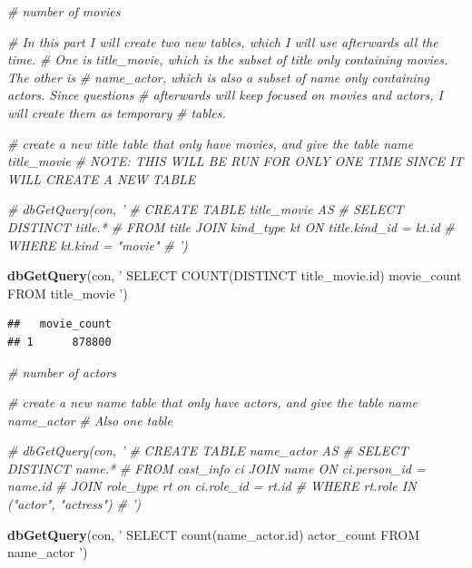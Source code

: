 \documentclass[]{article}
\newenvironment{Shaded}{\begin{snugshade}}{\end{snugshade}}
\newcommand{\KeywordTok}[1]{\textcolor[rgb]{0.13,0.29,0.53}{\textbf{{#1}}}}
\newcommand{\StringTok}[1]{\textcolor[rgb]{0.31,0.60,0.02}{{#1}}}
\newcommand{\CommentTok}[1]{\textcolor[rgb]{0.56,0.35,0.01}{\textit{{#1}}}}
\newcommand{\NormalTok}[1]{{#1}}
\begin{document}
\begin{Shaded}
\begin{Highlighting}[]
\CommentTok{# number of movies}

\CommentTok{# In this part I will create two new tables, which I will use afterwards all the time.}
\CommentTok{# One is title_movie, which is the subset of title only containing movies. The other is}
\CommentTok{# name_actor, which is also a subset of name only containing actors. Since questions}
\CommentTok{# afterwards will keep focused on movies and actors, I will create them as temporary}
\CommentTok{# tables.}

\CommentTok{# create a new title table that only have movies, and give the table name title_movie}
\CommentTok{# NOTE: THIS WILL BE RUN FOR ONLY ONE TIME SINCE IT WILL CREATE A NEW TABLE}

\CommentTok{# dbGetQuery(con, '}
\CommentTok{#            CREATE TABLE title_movie AS}
\CommentTok{#            SELECT DISTINCT title.*}
\CommentTok{#            FROM title JOIN kind_type kt ON title.kind_id = kt.id}
\CommentTok{#            WHERE kt.kind = "movie"}
\CommentTok{#            ')}

\KeywordTok{dbGetQuery}\NormalTok{(con, }\StringTok{'}
\StringTok{           SELECT COUNT(DISTINCT title_movie.id) movie_count}
\StringTok{           FROM title_movie}
\StringTok{           '}\NormalTok{)}
\end{Highlighting}
\end{Shaded}

\begin{verbatim}
##   movie_count
## 1      878800
\end{verbatim}

\begin{Shaded}
\begin{Highlighting}[]
\CommentTok{# number of actors}

\CommentTok{# create a new name table that only have actors, and give the table name name_actor}
\CommentTok{# Also one table}

\CommentTok{# dbGetQuery(con, '}
\CommentTok{#            CREATE TABLE name_actor AS}
\CommentTok{#            SELECT DISTINCT name.*}
\CommentTok{#            FROM cast_info ci JOIN name ON ci.person_id = name.id}
\CommentTok{#               JOIN role_type rt on ci.role_id = rt.id}
\CommentTok{#            WHERE rt.role IN ("actor", "actress")}
\CommentTok{#            ')}


\KeywordTok{dbGetQuery}\NormalTok{(con, }\StringTok{'}
\StringTok{           SELECT count(name_actor.id) actor_count}
\StringTok{           FROM name_actor}
\StringTok{           '}\NormalTok{)}
\end{Highlighting}
\end{Shaded}
\end{document}
